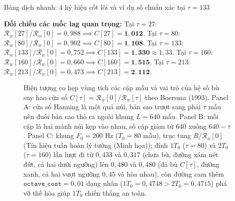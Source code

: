 \documentclass[11pt,a4paper]{article}
\begin{document}
\begin{thoughtqa}{Bảng dịch nhanh: 4 ký hiệu cốt lõi và ví dụ số chuẩn xác tại $\tau = 133$}
\begin{center}
\end{center}
\textbf{Đối chiếu các mốc lag quan trọng:}
Tại $\tau = 27$: $\mathcal{R}_w[27]/\mathcal{R}_w[0] = 0{,}988 \implies C[27] = \mathbf{1{,}012}$.
Tại $\tau = 80$: $\mathcal{R}_w[80]/\mathcal{R}_w[0] = 0{,}902 \implies C[80] = \mathbf{1{,}108}$.
Tại $\tau = 133$: $\mathcal{R}_w[133]/\mathcal{R}_w[0] = 0{,}752 \implies C[133] = \mathbf{1{,}330} \approx 1{,}33$.
Tại $\tau = 160$: $\mathcal{R}_w[160]/\mathcal{R}_w[0] = 0{,}660 \implies C[160] = \mathbf{1{,}515}$.
Tại $\tau = 213$: $\mathcal{R}_w[213]/\mathcal{R}_w[0] = 0{,}473 \implies C[213] = \mathbf{2{,}112}$.
\end{thoughtqa}

\begin{figure}[H]
\centering
\resizebox{0.95\textwidth}{!}{}
\caption{Hiện tượng co hẹp vùng tích các cặp mẫu và vai trò của hệ số bù suy hao cửa sổ $C[\tau] = \mathcal{R}_w[0]/\mathcal{R}_w[\tau]$ theo Boersma (1993). Panel A: cửa sổ Hanning là một quả núi, bản sao trượt sang phải $\tau$ mẫu nên đuôi bản sao thò ra ngoài khung $L = 640$ mẫu. Panel B: mỗi cặp là hai mảnh núi kẹp vào nhau, số cặp giảm từ $640$ xuống $640 - \tau$. Panel C: khung $F_0 = 200\text{ Hz}$ ($T_0 = 80$ mẫu), trục tung $R/\mathcal{R}_x[0]$ (Tín hiệu tuần hoàn lý tưởng (Minh họa)); đỉnh $1T_0$ ($\tau = 80$) và $2T_0$ ($\tau = 160$) lần lượt đi từ $0{,}433$ và $0{,}317$ (chưa bù, đường xám nét đứt, cả hai dưới ngưỡng) lên $0{,}480$ và $0{,}480$ (đã bù $C[\tau]$, đường xanh, cả hai vượt ngưỡng $0{,}45$ và hòa nhau), còn đường cam thêm $\texttt{octave\_cost} = 0{,}01$ dạng nhân ($1T_0 = 0{,}4748 > 2T_0 = 0{,}4715$) phá vỡ thế hòa giúp $1T_0$ chiến thắng an toàn.}
\label{fig:acf_compensation}
\end{figure}
\end{document}

